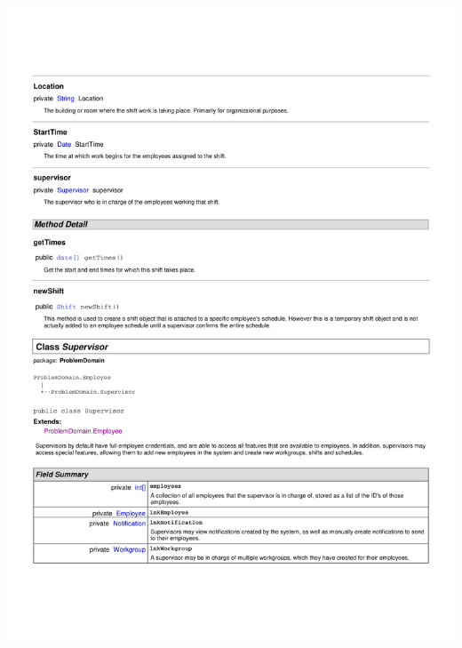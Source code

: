 \documentclass[letterpaper,12pt]{report}
\begin{document}
\includegraphics[scale=0.9,trim=20mm 30mm 25mm 25mm]{externals/ProblemDomainDataDictionary13.pdf}
\newpage
\end{document}
